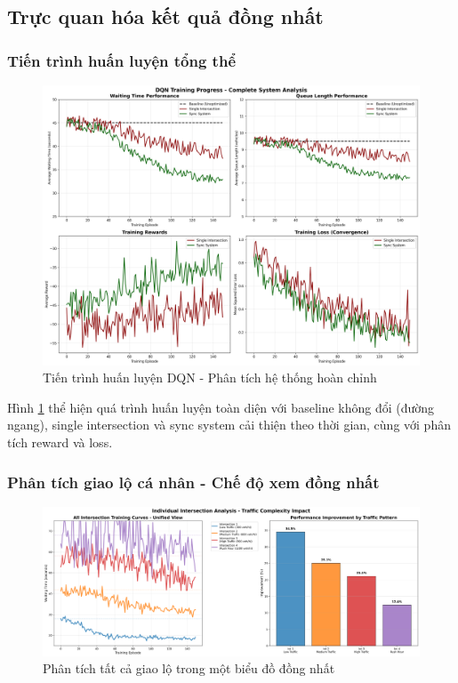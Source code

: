 \subsection{Trực quan hóa kết quả đồng nhất}

\subsubsection{Tiến trình huấn luyện tổng thể}

\begin{figure}[!htp]
    \centering
    \includegraphics[width=\textwidth]{figures/01_training_progress.png}
    \caption{Tiến trình huấn luyện DQN - Phân tích hệ thống hoàn chỉnh}
    \label{fig:comprehensive_training_progress}
\end{figure}

Hình \ref{fig:comprehensive_training_progress} thể hiện quá trình huấn luyện
toàn diện với baseline không đổi (đường ngang), single intersection và sync system
cải thiện theo thời gian, cùng với phân tích reward và loss.

\subsubsection{Phân tích giao lộ cá nhân - Chế độ xem đồng nhất}

\begin{figure}[!htp]
    \centering
    \includegraphics[width=\textwidth]{figures/02_unified_intersections.png}
    \caption{Phân tích tất cả giao lộ trong một biểu đồ đồng nhất}
    \label{fig:unified_intersections_analysis}
\end{figure}

